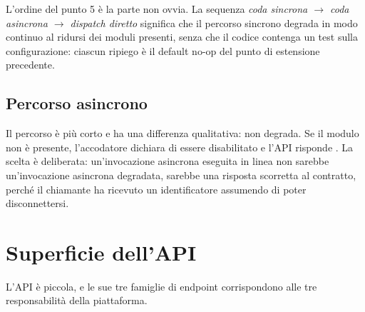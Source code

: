 L'ordine del punto 5 \`e la parte non ovvia. La sequenza \emph{coda sincrona
$\to$ coda asincrona $\to$ dispatch diretto} significa che il percorso sincrono
degrada in modo continuo al ridursi dei moduli presenti, senza che il codice
contenga un test sulla configurazione: ciascun ripiego \`e il default no-op del
punto di estensione precedente.

\subsection{Percorso asincrono}

Il percorso  \`e pi\`u corto e ha una differenza qualitativa: non
degrada. Se il modulo  non \`e presente, l'accodatore dichiara
di essere disabilitato e l'API risponde . La scelta
\`e deliberata: un'invocazione asincrona eseguita in linea non sarebbe
un'invocazione asincrona degradata, sarebbe una risposta scorretta al contratto,
perch\'e il chiamante ha ricevuto un identificatore assumendo di poter
disconnettersi.

\section{Superficie dell'API}

L'API \`e piccola, e le sue tre famiglie di endpoint corrispondono alle tre
responsabilit\`a della piattaforma.

